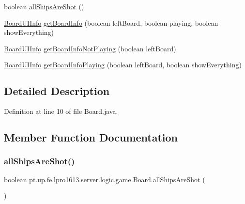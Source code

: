 \begin{DoxyCompactItemize}
boolean \hyperlink{classpt_1_1up_1_1fe_1_1lpro1613_1_1server_1_1logic_1_1game_1_1_board_a0aaf6e39aedc8ce82243f27d826c2a0e}{all\+Ships\+Are\+Shot} ()
\item 
\hyperlink{classpt_1_1up_1_1fe_1_1lpro1613_1_1sharedlib_1_1tuples_1_1_board_u_i_info}{Board\+U\+I\+Info} \hyperlink{classpt_1_1up_1_1fe_1_1lpro1613_1_1server_1_1logic_1_1game_1_1_board_a85a7b77f160e088eae0cb3dc1144c919}{get\+Board\+Info} (boolean left\+Board, boolean playing, boolean show\+Everything)
\item 
\hyperlink{classpt_1_1up_1_1fe_1_1lpro1613_1_1sharedlib_1_1tuples_1_1_board_u_i_info}{Board\+U\+I\+Info} \hyperlink{classpt_1_1up_1_1fe_1_1lpro1613_1_1server_1_1logic_1_1game_1_1_board_aedd40d2273ef056df4cd268da4ca383f}{get\+Board\+Info\+Not\+Playing} (boolean left\+Board)
\item 
\hyperlink{classpt_1_1up_1_1fe_1_1lpro1613_1_1sharedlib_1_1tuples_1_1_board_u_i_info}{Board\+U\+I\+Info} \hyperlink{classpt_1_1up_1_1fe_1_1lpro1613_1_1server_1_1logic_1_1game_1_1_board_aad5a0afec5d59e53ed3e1e7f3aedcc25}{get\+Board\+Info\+Playing} (boolean left\+Board, boolean show\+Everything)
\end{DoxyCompactItemize}


\subsection{Detailed Description}


Definition at line 10 of file Board.\+java.



\subsection{Member Function Documentation}
\hypertarget{classpt_1_1up_1_1fe_1_1lpro1613_1_1server_1_1logic_1_1game_1_1_board_a0aaf6e39aedc8ce82243f27d826c2a0e}{}\label{classpt_1_1up_1_1fe_1_1lpro1613_1_1server_1_1logic_1_1game_1_1_board_a0aaf6e39aedc8ce82243f27d826c2a0e} 
\subsubsection{\texorpdfstring{all\+Ships\+Are\+Shot()}{allShipsAreShot()}}
{\footnotesize\ttfamily boolean pt.\+up.\+fe.\+lpro1613.\+server.\+logic.\+game.\+Board.\+all\+Ships\+Are\+Shot (\begin{DoxyParamCaption}{ }\end{DoxyParamCaption})}



